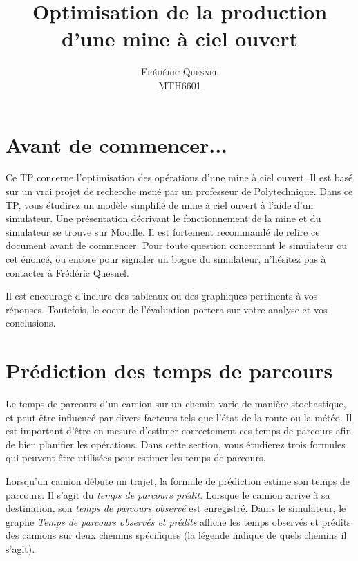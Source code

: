 \documentclass[letterpaper,12pt]{article}
\title{ Optimisation de la production d'une mine à ciel ouvert }
\author{\textsc{\large{Frédéric Quesnel}} \\ MTH6601}
\begin{document}
	
	\maketitle
	
	\setcounter{section}{-1}
	
	\section{Avant de commencer...}
	Ce TP concerne l'optimisation des opérations d'une mine à ciel ouvert. Il est basé sur un vrai projet de recherche mené par un professeur de Polytechnique. Dans ce TP, vous étudirez un modèle simplifié de mine à ciel ouvert à l'aide d'un simulateur. Une présentation décrivant le fonctionnement de la mine et du simulateur se trouve sur Moodle. Il est fortement recommandé de relire ce document avant de commencer. Pour toute question concernant le simulateur ou cet énoncé, ou encore pour signaler un bogue du simulateur, n'hésitez pas à contacter à Frédéric Quesnel. 
	
	
	Il est encouragé d'inclure des tableaux ou des graphiques pertinents à vos réponses. Toutefois, le coeur de l'évaluation portera sur votre analyse et vos conclusions. 
	
	
	
	\section{Prédiction des temps de parcours}

	Le temps de parcours d’un camion sur un chemin varie de manière stochastique, et peut être influencé par divers facteurs tels que l’état de la route ou la météo. Il est important d'être en mesure d'estimer correctement ces temps de parcours afin de bien planifier les opérations. Dans cette section, vous étudierez trois formules qui peuvent être utilisées pour estimer les temps de parcours. 
	
	Lorsqu'un camion débute un trajet, la formule de prédiction estime son temps de parcours. Il s'agit du \textit{temps de parcours prédit}. Lorsque le camion arrive à sa destination, son \textit{temps de parcours observé} est enregistré. Dams le simulateur, le graphe \textit{Temps de parcours observés et prédits} affiche les temps observés et prédits des camions sur deux chemins spécifiques (la légende indique de quels chemins il s'agit).
	
\end{document}
